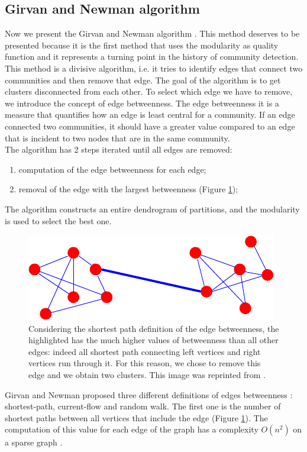 \subsection{Girvan and Newman algorithm}
Now we present the Girvan and Newman algorithm \cite{Girvan2002Community}. This method deserves to be presented because it is the first method that uses the modularity as quality function \cite{Newman_2004} and it represents a turning point in the history of community detection. This method is a divisive algorithm, i.e. it tries to identify edges that connect two communities and then remove that edge. The goal of the algorithm is to get clusters disconnected from each other.  
To select which edge we have to remove, we introduce the concept of edge betweenness.
The edge betweenness it is a measure that quantifies how an edge is least central for a community. 
If an edge connected two communities, it should have a greater value compared to an edge that is incident to two nodes that are in the same community. \\
The algorithm has 2 steps iterated until all edges are removed:
\begin{enumerate}
	\item computation of the edge betweenness for each edge;
	\item removal of the edge with the largest betweenness (Figure \ref{fig:edgebtw});
\end{enumerate}
The algorithm constructs an entire dendrogram of partitions, and the modularity is used to select the best one.
\begin{figure}
	\centering
	\includegraphics[width=0.7\linewidth]{0-resources/edgebtw}
	\caption{Considering the shortest path definition of the edge betweenness, the highlighted has the much higher values of betweenness than all other edges: indeed all shortest path connecting left vertices and right vertices run through it. For this reason, we chose to remove this edge and we obtain two clusters. This image was reprinted from \cite{fortunato2007community}. }
	\label{fig:edgebtw}
\end{figure}
\noindent Girvan and Newman proposed three different definitions of edges betweenness \cite{Newman_2004}: shortest-path, current-flow and random walk. The first one is the number of shortest paths between all vertices that include the edge (Figure \ref{fig:edgebtw}). The computation of this value for each edge of the graph has a complexity $O(n^2)$ on a sparse graph \cite{Newman_2004}. 

